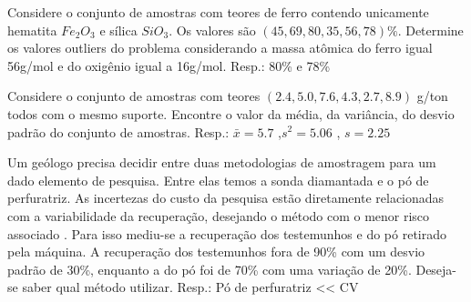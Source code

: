 \begin{exercise}
	Considere o conjunto de amostras com teores de ferro contendo unicamente hematita $Fe_{2}O_{3}$ e sílica $SiO_{3}$. Os valores são $\left(45,69,80,35,56,78\right)\%$. Determine os valores outliers do problema considerando a massa atômica do ferro igual 56g/mol e do oxigênio igual a 16g/mol. Resp.: 80\% e 78\%
\end{exercise}
\begin{exercise}
	Considere o conjunto de amostras com teores $\left(2.4,5.0,7.6,4.3,2.7,8.9\right)$ g/ton todos com o mesmo suporte. Encontre o valor da média, da variância, do desvio padrão do conjunto de amostras. Resp.: $\bar{x}= 5.7$ ,$s^2 = 5.06$ , $s = 2.25$
\end{exercise}
\begin{exercise}
	Um geólogo precisa decidir entre duas metodologias de amostragem para um dado elemento de pesquisa. Entre elas temos a sonda diamantada e o pó de perfuratriz. As incertezas do custo da pesquisa estão diretamente relacionadas com a variabilidade da recuperação, desejando o método com o menor risco associado . Para isso mediu-se a recuperação dos testemunhos e do pó retirado pela máquina. A recuperação dos testemunhos fora de 90\% com um desvio padrão de 30\%, enquanto a do pó foi de 70\% com uma variação de 20\%. Deseja-se saber qual método utilizar. Resp.: Pó de perfuratriz << CV
\end{exercise}
	
	 

